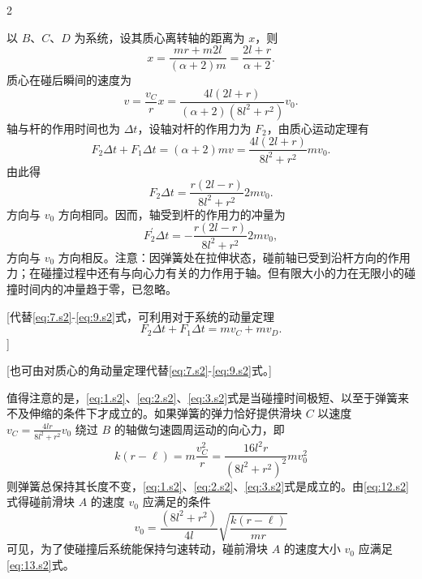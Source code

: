 \begin{solution}{2}
\begin{subsolution}
以 $B$、$C$、$D$ 为系统，设其质心离转轴的距离为 $x$，则
\begin{equation}
x = \frac{m r + m 2l}{(\alpha+2)m} = \frac{2l+r}{\alpha+2}.
\label{eq:7.s2}
\end{equation}
质心在碰后瞬间的速度为
\begin{equation}
v = \frac{v_{C}}{r} x = \frac{4l(2l+r)}{(\alpha+2)(8l^{2}+r^{2})} v_{0}.
\label{eq:8.s2}
\end{equation}
轴与杆的作用时间也为 $\Delta t$，设轴对杆的作用力为 $F_{2}$，由质心运动定理有
\begin{equation}
F_{2} \Delta t + F_{1} \Delta t = (\alpha+2) m v = \frac{4l(2l+r)}{8l^{2}+r^{2}} m v_{0}.
\label{eq:9.s2}
\end{equation}
由此得
\begin{equation}
F_{2} \Delta t = \frac{r(2l-r)}{8l^{2}+r^{2}} 2m v_{0}.
\label{eq:10.s2}
\end{equation}
方向与 $v_{0}$ 方向相同。因而，轴受到杆的作用力的冲量为
\begin{equation}
F_{2}^{\prime} \Delta t = -\frac{r(2l-r)}{8l^{2}+r^{2}} 2m v_{0},
\label{eq:11.s2}
\end{equation}
方向与 $v_{0}$ 方向相反。注意：因弹簧处在拉伸状态，碰前轴已受到沿杆方向的作用力；在碰撞过程中还有与向心力有关的力作用于轴。但有限大小的力在无限小的碰撞时间内的冲量趋于零，已忽略。

[代替\eqref{eq:7.s2}-\eqref{eq:9.s2}式，可利用对于系统的动量定理
\begin{equation*}
F_{2} \Delta t + F_{1} \Delta t = m v_{C} + m v_{D}.
\end{equation*}
]

[也可由对质心的角动量定理代替\eqref{eq:7.s2}-\eqref{eq:9.s2}式。]
\end{subsolution}

\begin{subsolution}
值得注意的是，\eqref{eq:1.s2}、\eqref{eq:2.s2}、\eqref{eq:3.s2}式是当碰撞时间极短、以至于弹簧来不及伸缩的条件下才成立的。如果弹簧的弹力恰好提供滑块 $C$ 以速度 $v_{C}=\frac{4lr}{8l^{2}+r^{2}}v_{0}$ 绕过 $B$ 的轴做匀速圆周运动的向心力，即
\begin{equation}
k(r-\ell) = m \frac{v_{C}^{2}}{r} = \frac{16 l^{2} r}{(8l^{2}+r^{2})^{2}} m v_{0}^{2}
\label{eq:12.s2}
\end{equation}
则弹簧总保持其长度不变，\eqref{eq:1.s2}、\eqref{eq:2.s2}、\eqref{eq:3.s2}式是成立的。由\eqref{eq:12.s2}式得碰前滑块 $A$ 的速度 $v_{0}$ 应满足的条件
\begin{equation}
v_{0} = \frac{(8l^{2}+r^{2})}{4l} \sqrt{\frac{k(r-\ell)}{m r}}
\label{eq:13.s2}
\end{equation}
可见，为了使碰撞后系统能保持匀速转动，碰前滑块 $A$ 的速度大小 $v_{0}$ 应满足\eqref{eq:13.s2}式。
\end{subsolution}
\end{solution}